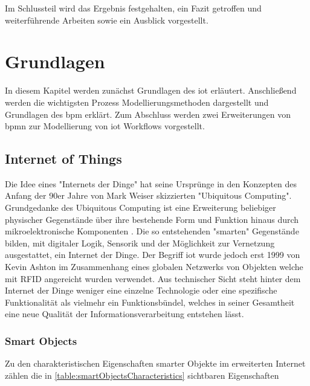 \documentclass[a4paper, 12pt, twoside, headsepline=true]{scrartcl} %
\begin{document}
Im Schlussteil wird das Ergebnis festgehalten, ein Fazit getroffen und weiterführende Arbeiten sowie ein Ausblick vorgestellt.
 
\newpage

\section{Grundlagen} \label{sec:section2}
In diesem Kapitel werden zunächst Grundlagen des \ac{iot} erläutert. Anschließend werden die wichtigsten Prozess Modellierungsmethoden dargestellt und Grundlagen des \ac{bpm} erklärt. Zum Abschluss werden zwei Erweiterungen von \ac{bpmn} zur Modellierung von \ac{iot} Workflows vorgestellt.

\subsection{Internet of Things}

Die Idee eines "Internets der Dinge" hat seine Ursprünge in den Konzepten des Anfang der 90er Jahre von Mark Weiser skizzierten "Ubiquitous Computing". 
Grundgedanke des Ubiquitous Computing ist eine Erweiterung beliebiger physischer Gegenstände über ihre bestehende Form und Funktion hinaus durch mikroelektronische Komponenten \cite{237456}. Die so entstehenden "smarten" Gegenstände bilden, mit digitaler Logik, Sensorik und der Möglichkeit zur Vernetzung ausgestattet, ein Internet der Dinge. Der Begriff \acl{iot} wurde jedoch erst 1999 von Kevin Ashton im Zusammenhang eines globalen Netzwerks von Objekten welche mit RFID angereicht wurden verwendet. 
Aus technischer Sicht steht hinter dem Internet der Dinge weniger eine einzelne Technologie oder eine spezifische Funktionalität als vielmehr ein Funktionsbündel, welches in seiner Gesamtheit eine neue Qualität der Informationsverarbeitung entstehen lässt.

\subsubsection{Smart Objects}
 Zu den charakteristischen Eigenschaften smarter Objekte im erweiterten Internet zählen die in \ref{table:smartObjectsCharacteristics} sichtbaren Eigenschaften
\end{document}
